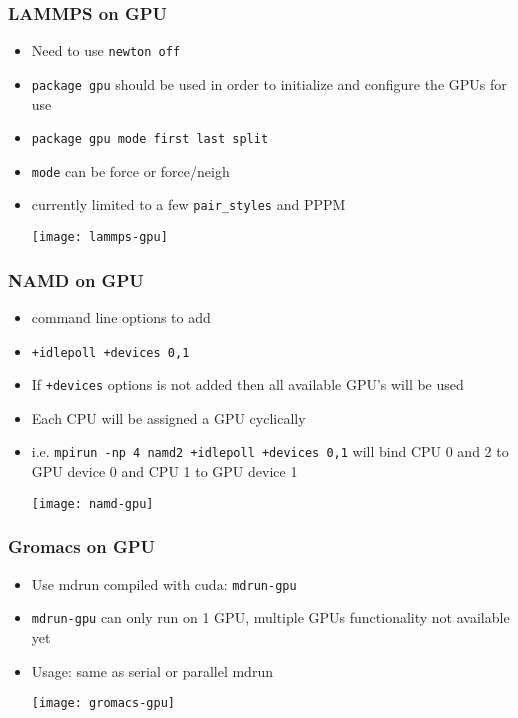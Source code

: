 \documentclass[slidestop,mathserif,compress,xcolor=svgnames]{beamer}
\begin{document}
\begin{frame}
  \frametitle{\small LAMMPS on GPU}
  \begin{itemize}
  \item Need to use \texttt{newton off}
  \item \texttt{package gpu} should be used in order to initialize and configure the GPUs for use
  \item[] \texttt{package gpu mode first last split}
  \item[] \texttt{mode} can be force or force/neigh
  \item currently limited to a few \texttt{pair\_styles} and PPPM
    \begin{center}
      \texttt{[image: lammps-gpu]}
    \end{center}
  \end{itemize}
\end{frame}

\begin{frame}
  \frametitle{\small NAMD on GPU}
  \begin{itemize}
  \item command line options to add
  \item[] \texttt{+idlepoll +devices 0,1}
  \item[] If \texttt{+devices} options is not added then all available GPU's will be used
  \item[] Each CPU will be assigned a GPU cyclically
  \item[] i.e. \texttt{mpirun -np 4 namd2 +idlepoll +devices 0,1} will bind CPU 0 and 2 to GPU device 0 and CPU 1 to GPU device 1
    \begin{center}
      \texttt{[image: namd-gpu]}
    \end{center}
  \end{itemize}
\end{frame}

\begin{frame}
  \frametitle{\small Gromacs on GPU}
  \begin{itemize}
  \item Use mdrun compiled with cuda: \texttt{mdrun-gpu}
  \item \texttt{mdrun-gpu} can only run on 1 GPU, multiple GPUs functionality not available yet
  \item Usage: same as serial or parallel mdrun
    \begin{center}
      \texttt{[image: gromacs-gpu]}
    \end{center}
  \end{itemize}
\end{frame}
\end{document}
